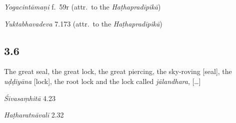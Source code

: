 \begin{ekdosis}
\begin{testimonia}[hp03_005]
\emph{Yogacintāmaṇi} f.~59r (attr.~to the \emph{Haṭhapradīpikā})
\begin{versinnote}
\end{versinnote}

\emph{Yuktabhavadeva} 7.173 (attr.~to the \emph{Haṭhapradīpikā})
\begin{versinnote}
\end{versinnote}
\end{testimonia}


\subsection*{3.6}
\begin{translation}[hp03_006]
The great seal, the great lock, the great piercing, the sky-roving [seal], the \emph{uḍḍiyāna} [lock], the root lock and the lock called \emph{jālandhara}, [\dots] 
\end{translation}

\begin{sources}[hp03_006]

\emph{Śivasaṃhitā} 4.23
\begin{versinnote}
\end{versinnote}
\end{sources}

\begin{testimonia}[hp03_006]
\emph{Haṭharatnāvalī} 2.32

\begin{versinnote}
\end{versinnote}


\end{testimonia}
\end{ekdosis}
